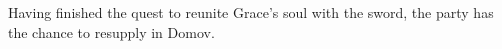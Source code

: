 Having finished the quest to reunite Grace's soul with the sword, the party has the chance to resupply in Domov.
